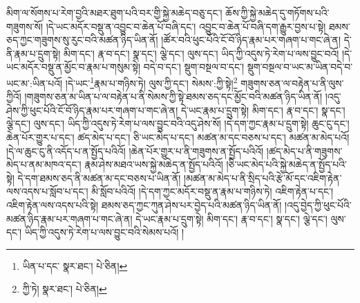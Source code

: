མིག་ལ་སོགས་པ་རེག་བྱའི་མཐར་ཐུག་པའི་བར་གྱི་སྐྱེ་མཆེད་བཅུ་དང་། ཆོས་ཀྱི་སྐྱེ་མཆེད་དུ་གཏོགས་པའི་གཟུགས་སོ། །དེ་ཡང་མདོར་བསྡུ་ན་འབྱུང་བ་ཆེན་པོ་བཞི་དང་། འབྱུང་བ་ཆེན་པོ་བཞི་དག་རྒྱུར་བྱས་པ་སྟེ། ཐམས་ཅད་ཀྱང་གཟུགས་སུ་རུང་བའི་མཚན་ཉིད་ཡིན་ནོ། །ཚོར་བའི་ཕུང་པོའི་ངོ་བོ་ཉིད་རྣམ་པར་གཞག་པ་གང་ཞེ་ན། དེ་ནི་རྣམ་པ་དྲུག་སྟེ། མིག་དང་། རྣ་བ་དང་། སྣ་དང་། ལྕེ་དང་། ལུས་དང་། ཡིད་ཀྱི་འདུས་ཏེ་རེག་པ་ལས་བྱུང་བའོ། །དེ་ཡང་མདོར་བསྡུ་ན་མྱོང་བ་རྣམ་པ་གསུམ་སྟེ། བདེ་བ་དང་། སྡུག་བསྔལ་བ་དང་། སྡུག་བསྔལ་བ་ཡང་མ་ཡིན་བདེ་བ་ཡང་མ་:ཡིན་པའོ། །དེ་ཡང་\footnote{ཡིན་པ་དང་  སྣར་ཐང་།  པེ་ཅིན། }རྣམ་པ་གཉིས་ཏེ། ལུས་ཀྱི་དང་། སེམས་:ཀྱི་སྟེ།\footnote{ཀྱི་ཏེ།  སྣར་ཐང་།  པེ་ཅིན། } གཟུགས་ཅན་ལ་བརྟེན་པ་ནི་ལུས་ཀྱིའོ། །གཟུགས་ཅན་མ་ཡིན་པ་ལ་བརྟེན་པ་ནི་སེམས་ཀྱི་སྟེ་ཐམས་ཅད་དང་མྱོང་བའི་མཚན་ཉིད་ཡིན་ནོ། །འདུ་ཤེས་ཀྱི་ཕུང་པོའི་ངོ་བོ་ཉིད་རྣམ་པར་གཞག་པ་གང་ཞེ་ན། དེ་ཡང་རྣམ་པ་དྲུག་སྟེ། མིག་དང་། རྣ་བ་དང་། སྣ་དང་། ལྕེ་དང་། ལུས་དང་། ཡིད་ཀྱི་འདུས་ཏེ་རེག་པ་ལས་བྱུང་བའི་འདུ་ཤེས་སོ། །དེ་དག་ཀྱང་རྣམ་པ་དྲུག་སྟེ། ཆུང་ངུ་དང་། ཆེན་པོར་གྱུར་པ་དང་། ཚད་མེད་པ་དང་། ཅི་ཡང་མེད་པ་དང་། མཚན་མ་དང་བཅས་པ་དང་། མཚན་མ་མེད་པའོ། །དེ་ལ་ཆུང་ངུ་ནི་འདོད་པ་ན་སྤྱོད་པའིའོ། །ཆེན་པོར་གྱུར་པ་ནི་གཟུགས་ན་སྤྱོད་པའིའོ། །ཚད་མེད་པ་ནི་གཟུགས་མེད་པ་ནམ་མཁའ་དང་། རྣམ་ཤེས་མཐའ་ཡས་སྐྱེ་མཆེད་ན་སྤྱོད་པའིའོ། །ཅི་ཡང་མེད་པའི་སྐྱེ་མཆེད་ན་སྤྱོད་པའི་སྟེ། དེ་དག་ཐམས་ཅད་ནི་མཚན་མ་དང་བཅས་པ་ཡིན་ནོ། །མཚན་མ་མེད་པ་ནི་སྲིད་པའི་རྩེ་མོ་དང་འཇིག་རྟེན་ལས་འདས་པ་སློབ་པ་དང་། མི་སློབ་པའིའོ། །དེ་དག་ཀྱང་མདོར་བསྡུ་ན་རྣམ་པ་གཉིས་ཏེ། འཇིག་རྟེན་པ་དང་། འཇིག་རྟེན་ལས་འདས་པའི་སྟེ། ཐམས་ཅད་ཀྱང་ཀུན་ཤེས་པར་བྱེད་པའི་མཚན་ཉིད་ཡིན་ནོ། །འདུ་བྱེད་ཀྱི་ཕུང་པོའི་མཚན་ཉིད་རྣམ་པར་གཞག་པ་གང་ཞེ་ན། དེ་ཡང་རྣམ་པ་དྲུག་སྟེ། མིག་དང་། རྣ་བ་དང་། སྣ་དང་། ལྕེ་དང་། ལུས་དང་། ཡིད་ཀྱི་འདུས་ཏེ་རེག་པ་ལས་བྱུང་བའི་སེམས་པའོ། །
